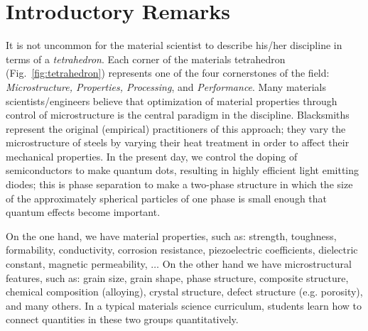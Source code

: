 \section{Introductory Remarks}
It is not uncommon for the material scientist to describe his/her discipline in terms of a \textit{tetrahedron}.  Each corner of the materials tetrahedron (Fig.~\ref{fig:tetrahedron}) represents one of the four cornerstones of the field: \textit{Microstructure, Properties, Processing}, and \textit{Performance}. Many materials scientists/engineers believe that optimization of material properties through control of microstructure is the central paradigm in the discipline.  Blacksmiths represent the original (empirical) practitioners of this approach; they vary the microstructure of steels by varying their heat treatment in order to affect their mechanical properties.  In the present day, we control the doping of semiconductors to make quantum dots, resulting in highly efficient light emitting diodes; this is phase separation to make a two-phase structure in which the size of the approximately spherical particles of one phase is small enough that quantum effects become important.

On the one hand, we have material properties, such as: strength, toughness, formability, conductivity, corrosion resistance, piezoelectric coefficients, dielectric constant, magnetic permeability, $\ldots$ On the other hand we have microstructural features, such as: grain size, grain shape, phase structure, composite structure, chemical composition (alloying), crystal structure, defect structure (e.g. porosity), and many others.  In a typical materials science curriculum, students learn how to connect quantities in these two groups quantitatively.  

